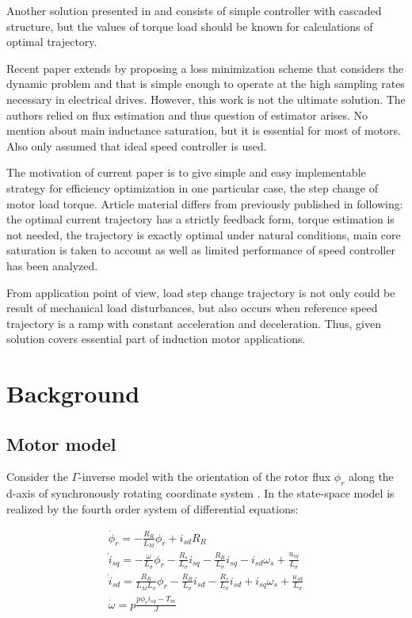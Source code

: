 \documentclass[journal]{IEEEtran}
\begin{document}
Another solution presented in \cite{7} and consists of simple controller with cascaded structure, but the values of torque load should be known for calculations of optimal trajectory.

Recent paper \cite{6} extends \cite{5} by proposing a loss minimization
scheme that considers the dynamic problem and that is simple
enough to operate at the high sampling rates necessary in electrical drives. However, this work is not the ultimate solution. The authors relied on flux estimation and thus question of estimator arises. No mention about main inductance saturation, but it is essential for most of motors. Also only assumed that ideal speed controller is used.


The motivation of current paper is to give simple and easy implementable strategy for efficiency optimization in one particular case, the step change of motor load torque. Article material differs from previously published in following: the optimal current trajectory has a strictly feedback form, torque estimation is not needed, the trajectory is exactly optimal under natural conditions, main core saturation is taken to account as well as limited performance of speed controller has been analyzed.

From application point of view, load step change trajectory is not only could be result of mechanical load disturbances, but also occurs when reference speed trajectory is a ramp with constant acceleration and deceleration. Thus, given solution covers essential part of induction motor applications.



\section{Background}

\subsection{Motor model}

Consider the $\Gamma$-inverse model with the orientation of the rotor flux $\phi_r$ along the d-axis of synchronously rotating coordinate system \cite{8}. In the state-space model is realized by the fourth order system of differential equations:

\begin{equation}\label{eq:motor}
\begin{gathered}
\dot \phi_r = -\frac{R_R}{L_M} \phi_r  + i_{sd} R_R \\  
\dot i_{sq} = - \frac{\omega}{ L_\sigma } \phi_r - \frac{R_s}{L_\sigma} i_{sq} - \frac{R_R}{L_\sigma} i_{sq} - i_{sd} \omega_s + \frac{u_{sq}}{L_\sigma} \\
\dot i_{sd} = \frac{R_R}{L_M L_\sigma} \phi_r - \frac{R_R}{L_\sigma} i_{sd} - \frac{R_s}{L_\sigma} i_{sd} + i_{sq} \omega_s + \frac{u_{sd}}{L_\sigma}  \\
\dot \omega = p\frac{p \phi_r i_{sq} - T_m}{ J }
\end{gathered}
\end{equation}
\end{document}
